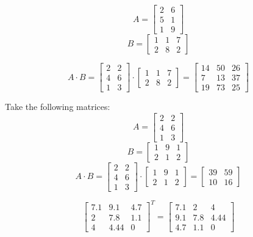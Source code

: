 \documentclass[10pt]{article}
\newenvironment{problem}[2][Problem]{\begin{trivlist}
\item[\hskip \labelsep {\bfseries #1}\hskip \labelsep {\bfseries #2.}]}{\end{trivlist}}
\begin{document}
\begin{problem}{4.1}

$$A=\begin{bmatrix} 2 & 6\\ 5 & 1 \\ 1 & 9\end{bmatrix}$$
$$B=\begin{bmatrix} 1 & 1 & 7\\2 & 8 & 2\end{bmatrix}$$

  $$A \cdot B=\begin{bmatrix} 2 & 2\\ 4 & 6 \\ 1 & 3\end{bmatrix}\cdot \begin{bmatrix} 1 & 1 & 7\\2 & 8 & 2\end{bmatrix}=\begin{bmatrix} 14 & 50 & 26\\7 & 13 & 37\\ 19 & 73 & 25 \end{bmatrix}$$
 
\end{problem}

\begin{problem}{4.2}
Take the following matrices:
$$A=\begin{bmatrix} 2 & 2\\ 4 & 6 \\ 1 & 3\end{bmatrix}$$
$$B=\begin{bmatrix} 1 & 9 & 1\\2 & 1 & 2\end{bmatrix}$$
$$A \cdot B=\begin{bmatrix} 2 & 2\\ 4 & 6 \\ 1 & 3\end{bmatrix}\cdot \begin{bmatrix} 1 & 9 & 1\\2 & 1 & 2\end{bmatrix}=\begin{bmatrix} 39 & 59\\ 10 & 16 \end{bmatrix}$$
\end{problem}

\begin{problem}{4.3}

$$\begin{bmatrix}7.1 & 9.1 & 4.7\\ 2 & 7.8 & 1.1 \\ 4 & 4.44 & 0\end{bmatrix}^T=\begin{bmatrix}7.1 & 2 & 4\\ 9.1 & 7.8 & 4.44 \\ 4.7 & 1.1 & 0\end{bmatrix}$$
\end{problem}
\end{document}
